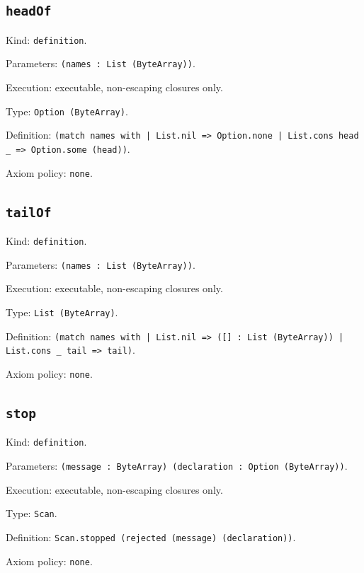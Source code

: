 \documentclass[11pt]{article}
\begin{document}
\subsection*{\texttt{headOf}}
\noindent Kind: \texttt{definition}.\par
\noindent Parameters: \texttt{(names : List (ByteArray))}.\par
\noindent Execution: executable, non-escaping closures only.\par
\noindent Type: \texttt{Option (ByteArray)}.\par
\noindent Definition: \texttt{(match names with | List.nil => Option.none | List.cons head \_ => Option.some (head))}.\par
\noindent Axiom policy: \texttt{none}.\par
\subsection*{\texttt{tailOf}}
\noindent Kind: \texttt{definition}.\par
\noindent Parameters: \texttt{(names : List (ByteArray))}.\par
\noindent Execution: executable, non-escaping closures only.\par
\noindent Type: \texttt{List (ByteArray)}.\par
\noindent Definition: \texttt{(match names with | List.nil => ([] : List (ByteArray)) | List.cons \_ tail => tail)}.\par
\noindent Axiom policy: \texttt{none}.\par
\subsection*{\texttt{stop}}
\noindent Kind: \texttt{definition}.\par
\noindent Parameters: \texttt{(message : ByteArray) (declaration : Option (ByteArray))}.\par
\noindent Execution: executable, non-escaping closures only.\par
\noindent Type: \texttt{Scan}.\par
\noindent Definition: \texttt{Scan.stopped (rejected (message) (declaration))}.\par
\noindent Axiom policy: \texttt{none}.\par
\end{document}
